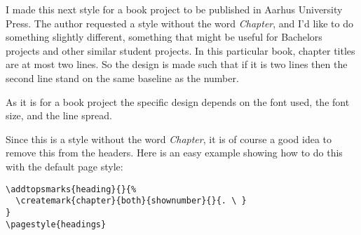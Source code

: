 \endgroup


\starbreak

I made this next style for a book project to be published in Aarhus
University Press. The author requested a style without the word
\emph{Chapter}, and I'd like to do something slightly different,
something that might be useful for Bachelors projects and other
similar student projects. In this particular book, chapter titles are
at most two lines. So the design is made such that if it is two lines
then the second line stand on the same baseline as the number.

As it is for a book project the specific design depends on the font
used, the font size, and the line spread. 

Since this is a style without the word \emph{Chapter}, it is of course
a good idea to remove this from the headers. Here is an easy example
showing how to do this with the default page style:
\begin{verbatim}
\addtopsmarks{heading}{}{%
  \createmark{chapter}{both}{shownumber}{}{. \ }
}
\pagestyle{headings}
\end{verbatim}



